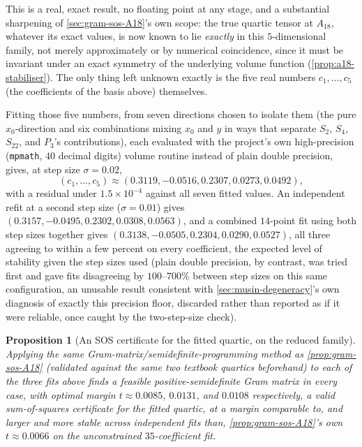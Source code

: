 \documentclass[11pt,reqno]{amsart}
\renewcommand{\_}{\origunderscore\allowbreak}
\numberwithin{equation}{section}
\theoremstyle{plain}
\newtheorem{prop}[thm]{Proposition}
\theoremstyle{definition}
\theoremstyle{remark}
\begin{document}
This is a real, exact result, no floating point at any stage, and
a substantial sharpening of \cref{sec:gram-sos-A18}'s own scope: the true
quartic tensor at $A_{18}$, whatever its exact values, is now known to
lie \emph{exactly} in this $5$-dimensional family, not merely
approximately or by numerical coincidence, since it must be invariant
under an exact symmetry of the underlying volume function
(\cref{prop:a18-stabiliser}). The only thing left unknown exactly is the
five real numbers $c_1,\dots,c_5$ (the coefficients of the basis above)
themselves.

Fitting those five numbers, from seven directions chosen to isolate
them (the pure $x_0$-direction and six combinations mixing $x_0$ and $y$
in ways that separate $S_2$, $S_4$, $S_{22}$, and $P_3$'s contributions),
each evaluated with the project's own high-precision (\texttt{mpmath},
$40$ decimal digits) volume routine instead of plain double precision, gives, at step size $\sigma=0.02$,
\[
  (c_1,\dots,c_5)\approx(0.3119,-0.0516,0.2307,0.0273,0.0492),
\]
with a residual under $1.5\times10^{-4}$ against all seven fitted values.
An independent refit at a second step size ($\sigma=0.01$) gives
$(0.3157,-0.0495,0.2302,0.0308,0.0563)$, and a combined $14$-point fit
using both step sizes together gives $(0.3138,-0.0505,0.2304,0.0290,%
0.0527)$, all three agreeing to within a few percent on every
coefficient, the expected level of stability given the step sizes used
(plain double precision, by contrast, was tried first and gave fits
disagreeing by $100$--$700\%$ between step sizes on this same
configuration, an unusable result consistent with \cref{sec:musin-degeneracy}'s
own diagnosis of exactly this precision floor, discarded rather than
reported as if it were reliable, once caught by the two-step-size check).

\begin{prop}[An SOS certificate for the fitted quartic, on the reduced family]\label{prop:a18-sos-reduced}
Applying the same Gram-matrix/semidefinite-programming method as
\cref{prop:gram-sos-A18} (validated against the same two textbook
quartics beforehand) to each of the three fits above finds a feasible
positive-semidefinite Gram matrix in every case, with optimal margin
$t\approx0.0085$, $0.0131$, and $0.0108$ respectively, a valid
sum-of-squares certificate for the fitted quartic, at a margin
comparable to, and larger and more stable across independent
fits than, \cref{prop:gram-sos-A18}'s own $t\approx0.0066$ on the
unconstrained $35$-coefficient fit.
\end{prop}
\end{document}
